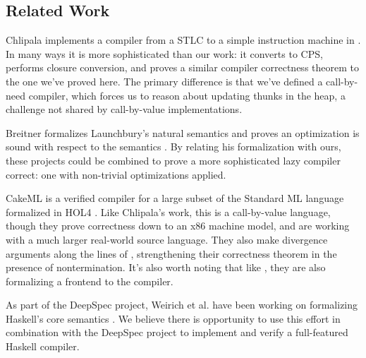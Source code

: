 \subsection{Related Work}

Chlipala implements a compiler from a STLC to a simple instruction machine in
\cite{chlipala2007certified}. In many ways it is more sophisticated than our 
work: it converts to CPS, performs closure conversion, and proves a similar
compiler correctness theorem to the one we've proved here. The primary
difference is that we've defined a call-by-need compiler, which forces us to
reason about updating thunks in the heap, a challenge not shared by
call-by-value implementations.

Breitner formalizes Launchbury's natural semantics and proves an optimization is
sound with respect to the semantics \cite{launchburynatural,breitnerthesis}. By
relating his formalization with ours, these projects could be combined to prove
a more sophisticated lazy compiler correct: one with non-trivial optimizations
applied.

CakeML \cite{cakeml14} is a verified compiler for a large subset of the Standard
ML language formalized in HOL4 \cite{slind2008brief}. Like Chlipala's work, this
is a call-by-value language, though they prove correctness down to an x86
machine model, and are working with a much larger real-world source language.
They also make divergence arguments along the lines of \cite{functionalbigstep},
strengthening their correctness theorem in the presence of nontermination. It's
also worth noting that like \cite{leroy2012compcert}, they are also formalizing
a frontend to the compiler. 

As part of the DeepSpec project, Weirich et al. have been working on formalizing
Haskell's core semantics \cite{weirich2017spec, spector2018total}. We believe
there is opportunity to use this effort in combination with the DeepSpec project
to implement and verify a full-featured Haskell compiler.


